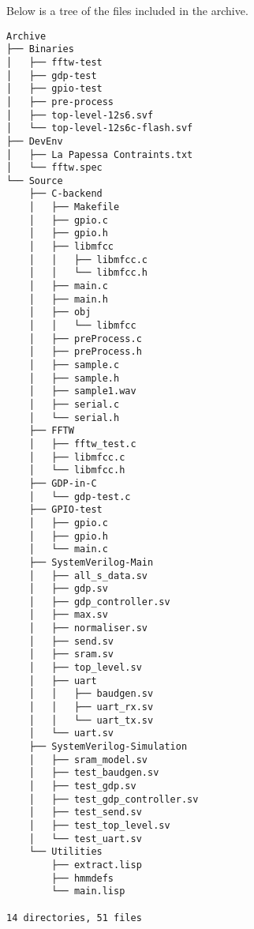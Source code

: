 Below is a tree of the files included in the archive.

\begin{lstlisting}
Archive
├── Binaries
│   ├── fftw-test
│   ├── gdp-test
│   ├── gpio-test
│   ├── pre-process
│   ├── top-level-12s6.svf
│   └── top-level-12s6c-flash.svf
├── DevEnv
│   ├── La Papessa Contraints.txt
│   └── fftw.spec
└── Source
    ├── C-backend
    │   ├── Makefile
    │   ├── gpio.c
    │   ├── gpio.h
    │   ├── libmfcc
    │   │   ├── libmfcc.c
    │   │   └── libmfcc.h
    │   ├── main.c
    │   ├── main.h
    │   ├── obj
    │   │   └── libmfcc
    │   ├── preProcess.c
    │   ├── preProcess.h
    │   ├── sample.c
    │   ├── sample.h
    │   ├── sample1.wav
    │   ├── serial.c
    │   └── serial.h
    ├── FFTW
    │   ├── fftw_test.c
    │   ├── libmfcc.c
    │   └── libmfcc.h
    ├── GDP-in-C
    │   └── gdp-test.c
    ├── GPIO-test
    │   ├── gpio.c
    │   ├── gpio.h
    │   └── main.c
    ├── SystemVerilog-Main
    │   ├── all_s_data.sv
    │   ├── gdp.sv
    │   ├── gdp_controller.sv
    │   ├── max.sv
    │   ├── normaliser.sv
    │   ├── send.sv
    │   ├── sram.sv
    │   ├── top_level.sv
    │   ├── uart
    │   │   ├── baudgen.sv
    │   │   ├── uart_rx.sv
    │   │   └── uart_tx.sv
    │   └── uart.sv
    ├── SystemVerilog-Simulation
    │   ├── sram_model.sv
    │   ├── test_baudgen.sv
    │   ├── test_gdp.sv
    │   ├── test_gdp_controller.sv
    │   ├── test_send.sv
    │   ├── test_top_level.sv
    │   └── test_uart.sv
    └── Utilities
        ├── extract.lisp
        ├── hmmdefs
        └── main.lisp

14 directories, 51 files
\end{lstlisting}
